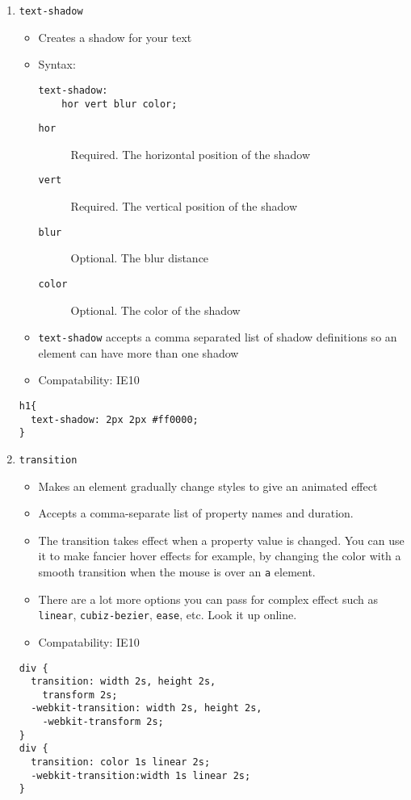\documentclass[10pt, twocolumn]{article}
\begin{document}
\begin{enumerate}
\item \texttt{text-shadow}
\begin{itemize}
\item Creates a shadow for your text
\item Syntax:
\begin{lstlisting}[frame=single]
text-shadow: 
    hor vert blur color;
\end{lstlisting}
\begin{description}
\item[\texttt{hor}] Required.  The horizontal position of the shadow
\item[\texttt{vert}] Required.  The vertical position of the shadow
\item[\texttt{blur}] Optional.  The blur distance
\item[\texttt{color}] Optional.  The color of the shadow
\end{description}
\item \texttt{text-shadow} accepts a comma separated list of shadow definitions so an element can have more than one shadow
\item Compatability: IE10
\end{itemize}
\begin{lstlisting}[frame=single]
h1{
  text-shadow: 2px 2px #ff0000;
}
\end{lstlisting}
\item \texttt{transition}
\begin{itemize}
\item Makes an element gradually change styles to give an animated effect
\item Accepts a comma-separate list of property names and duration.
\item The transition takes effect when a property value is changed.  You can use it to make fancier hover effects for example, by changing the color with a smooth transition when the mouse is over an \texttt{a} element.
\item There are a lot more options you can pass for complex effect such as \texttt{linear}, \texttt{cubiz-bezier}, \texttt{ease}, etc.  Look it up online.
\item Compatability: IE10
\end{itemize}
\begin{lstlisting}[frame=single]
div {
  transition: width 2s, height 2s,
    transform 2s;
  -webkit-transition: width 2s, height 2s, 
    -webkit-transform 2s;
}
div {
  transition: color 1s linear 2s;
  -webkit-transition:width 1s linear 2s;
}
\end{lstlisting}
\end{enumerate}
\end{document}
